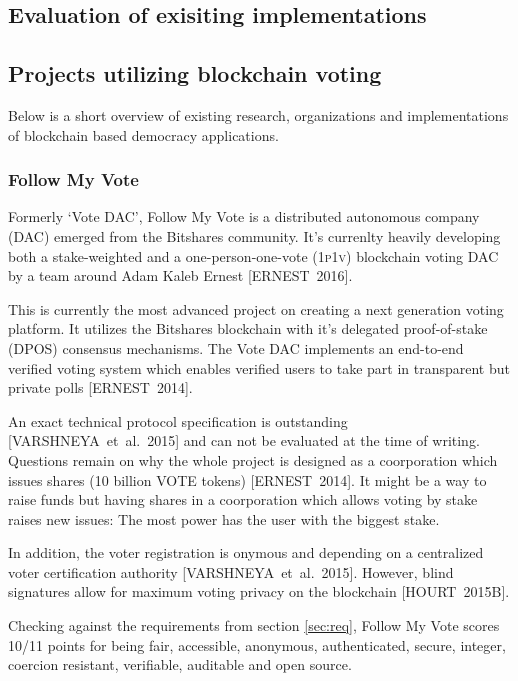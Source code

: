 \documentclass[9pt,oneside]{amsart}
\begin{document}
\begin{multicols}{2}
\section{Evaluation of exisiting implementations}

\subsection{Projects utilizing blockchain voting}
Below is a short overview of existing research, organizations and implementations of blockchain based democracy applications.


\subsubsection{Follow My Vote}
Formerly \enquote*{Vote DAC}, Follow My Vote is a distributed autonomous company (\textsc{DAC}) emerged from the Bitshares community. It's currenlty heavily developing both a stake-weighted and a one-person-one-vote (\textsc{1p1v}) blockchain voting DAC by a team around Adam Kaleb Ernest [ERNEST~2016].\par
This is currently the most advanced project on creating a next generation voting platform. It utilizes the Bitshares blockchain with it's delegated proof-of-stake (\textsc{DPOS}) consensus mechanisms. The Vote DAC implements an end-to-end verified voting system which enables verified users to take part in transparent but private polls [ERNEST~2014].\par
An exact technical protocol specification is outstanding [VARSHNEYA~et~al.~2015] and can not be evaluated at the time of writing. Questions remain on why the whole project is designed as a coorporation which issues shares (10 billion VOTE tokens) [ERNEST~2014]. It might be a way to raise funds but having shares in a coorporation which allows voting by stake raises new issues: The most power has the user with the biggest stake.\par
In addition, the voter registration is onymous and depending on a centralized voter certification authority [VARSHNEYA~et~al.~2015]. However, blind signatures allow for maximum voting privacy on the blockchain [HOURT~2015B].\par
Checking against the requirements from section \ref{sec:req}, Follow My Vote scores 10/11 points for being fair, accessible, anonymous, authenticated, secure, integer, coercion resistant, verifiable, auditable and open source.


\end{multicols}
\end{document}
